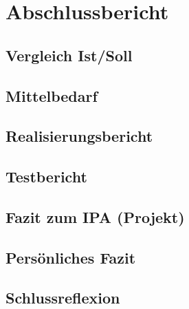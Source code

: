\chapter{Abschlussbericht}
\section{Vergleich Ist/Soll}
\section{Mittelbedarf}
\section{Realisierungsbericht}
\section{Testbericht}
\section{Fazit zum IPA (Projekt)}
\section{Persönliches Fazit}
\section{Schlussreflexion}
